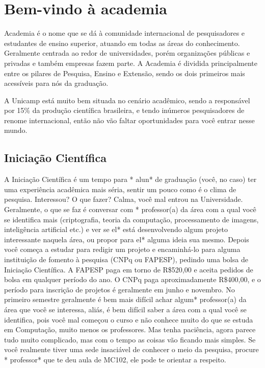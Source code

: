 
\section{Bem-vindo à academia}

Academia é o nome que se dá à comunidade internacional de pesquisadores e
estudantes de ensino superior, atuando em todas as áreas do
conhecimento. Geralmente centrada ao redor de universidades, porém organizações
públicas e privadas e também empresas fazem parte. A Academia é dividida
principalmente entre os pilares de Pesquisa, Ensino e Extensão, sendo os dois
primeiros mais acessíveis para nós da graduação.

A Unicamp está muito bem situada no cenário acadêmico, sendo a responsável por
15\% da produção científica brasileira, e tendo inúmeros pesquisadores de renome
internacional, então não vão faltar oportunidades para você entrar nesse mundo.

\subsection{Iniciação Científica}

A Iniciação Científica é um tempo para * alun* de graduação (você, no caso) ter
uma experiência acadêmica mais séria, sentir um pouco como é o clima de
pesquisa. Interessou? O que fazer? Calma, você mal entrou na Universidade.
Geralmente, o que se faz é conversar com * professor(a) da área com a qual você
se identifica mais (criptografia, teoria da computação, processamento de
imagens, inteligência artificial etc.) e ver se el* está desenvolvendo algum
projeto interessante naquela área, ou propor para el* alguma ideia sua mesmo.
Depois você começa a estudar para redigir um projeto e encaminhá-lo para alguma
instituição de fomento à pesquisa (CNPq ou FAPESP), pedindo uma bolsa de
Iniciação Científica. A FAPESP paga em torno de R\$520,00 e aceita pedidos de   %
bolsa em qualquer período do ano. O CNPq paga aproximadamente R\$400,00, e o
período para inscrição de projetos é geralmente em junho e novembro. No primeiro
semestre geralmente é bem mais difícil achar algum* professor(a) da área que
você se interessa, aliás, é bem difícil saber a área com a qual você se
identifica, pois você mal começou o curso e não conhece muito do que se estuda
em Computação, muito menos os professores. Mas tenha paciência, agora parece
tudo muito complicado, mas com o tempo as coisas vão ficando mais simples. Se
você realmente tiver uma sede insaciável de conhecer o meio da pesquisa, procure
* professor* que te deu aula de MC102, ele pode te orientar a respeito.

